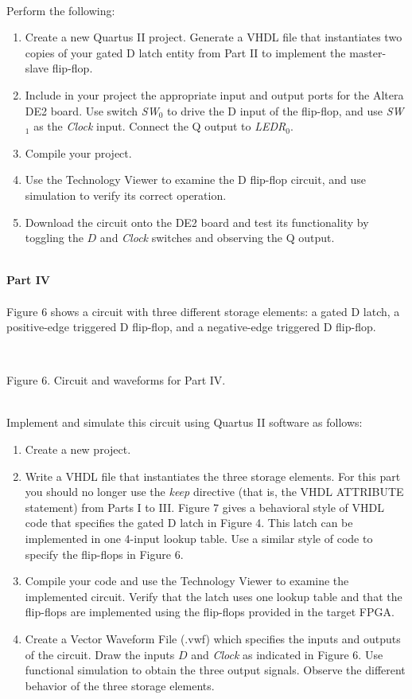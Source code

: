 \documentclass[epsfig,10pt,fullpage]{article}
\begin{document}
~\\
\noindent
Perform the following:
\begin{enumerate}
\item Create a new Quartus II project. Generate a VHDL file that instantiates two
copies of your gated D latch entity from Part II to implement the master-slave flip-flop.
\item Include in your project the appropriate input and output ports for the Altera
DE2 board. Use switch {\it SW}$_0$ to drive the D input of the flip-flop,
and use {\it SW}$_1$ as the {\it Clock} input. Connect the Q output to {\it LEDR}$_{0}$.
\item
Compile your project.
\item Use the Technology Viewer to examine the D flip-flop circuit, and use
simulation to verify its correct operation.
\item
Download the circuit onto the DE2 board and test its functionality 
by toggling the $D$ and {\it Clock} switches and observing the Q output.
\end{enumerate}

~\\
\noindent
{\bf Part IV}
~\\
~\\
\noindent
Figure 6 shows a circuit with three different storage elements: a gated D latch, 
a positive-edge triggered D flip-flop, and a negative-edge triggered D flip-flop.
~\\

\begin{figure}[H]
\scriptsize
\centerline{
\hbox{}}
\end{figure}
~\\
\centerline{Figure 6.  Circuit and waveforms for Part IV.}
~\\

\noindent
Implement and simulate this circuit using Quartus II software as follows:
\begin{enumerate}
\item Create a new project. 
\item Write a VHDL file that instantiates the three storage elements. For this part you
should no longer use the {\it keep} directive (that is, the VHDL ATTRIBUTE statement) 
from Parts I to III. Figure 7
gives a behavioral style of VHDL code that specifies the gated D latch in Figure 4.
This latch can be implemented in one 4-input lookup table. Use a similar style of
code to specify the flip-flops in Figure 6.
\item Compile your code and use the Technology Viewer to examine the implemented circuit.
Verify that the latch uses one lookup table and that the flip-flops are implemented using
the flip-flops provided in the target FPGA.
\item Create a Vector Waveform File (.vwf) which specifies the inputs and outputs
of the circuit. Draw the inputs $D$ and {\it Clock} as indicated in Figure 6.
Use functional simulation to obtain the three output signals.
Observe the different behavior of the three storage elements.
\end{enumerate}
\end{document}
